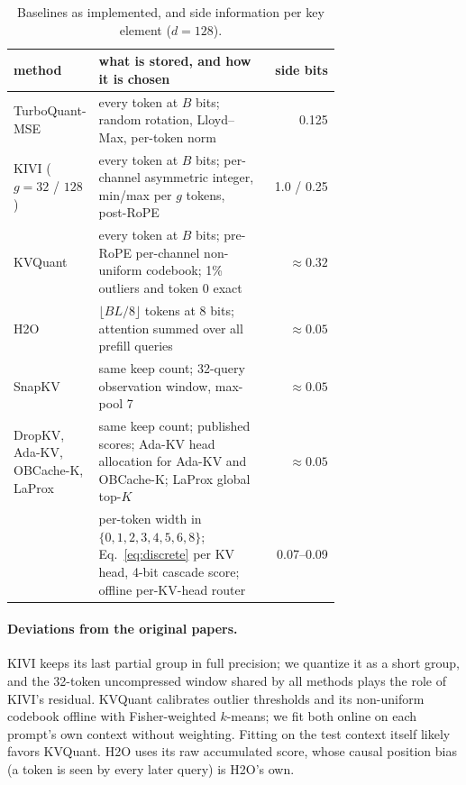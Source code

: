 \begin{table}[h]
\centering
\small
\setlength{\tabcolsep}{4pt}
\caption{Baselines as implemented, and side information per key element ($d=128$).}
\label{tab:app-side}
\begin{tabular}{@{}p{0.2\linewidth}p{0.52\linewidth}r@{}}
\toprule
method & what is stored, and how it is chosen & side bits \\
\midrule
TurboQuant-MSE & every token at $B$ bits; random rotation, Lloyd--Max, per-token norm & 0.125 \\
KIVI ($g=32$ / $128$) & every token at $B$ bits; per-channel asymmetric integer, min/max per $g$ tokens, post-RoPE & 1.0 / 0.25 \\
KVQuant & every token at $B$ bits; pre-RoPE per-channel non-uniform codebook; 1\% outliers and token 0 exact & $\approx0.32$ \\
H2O & $\lfloor BL/8\rfloor$ tokens at 8 bits; attention summed over all prefill queries & $\approx0.05$ \\
SnapKV & same keep count; 32-query observation window, max-pool 7 & $\approx0.05$ \\
DropKV, Ada-KV, OBCache-K, LaProx & same keep count; published scores; Ada-KV head allocation for Ada-KV and OBCache-K; LaProx global top-$K$ & $\approx0.05$ \\
\sieve{} & per-token width in $\{0,1,2,3,4,5,6,8\}$; Eq.~\ref{eq:discrete} per KV head, 4-bit cascade score; offline per-KV-head router & 0.07--0.09 \\
\bottomrule
\end{tabular}
\end{table}

\paragraph{Deviations from the original papers.}
KIVI keeps its last partial group in full precision; we quantize it as a short
group, and the 32-token uncompressed window shared by all methods plays the
role of KIVI's residual.  
KVQuant calibrates outlier thresholds and its
non-uniform codebook offline with Fisher-weighted $k$-means; we fit both online
on each prompt's own context without weighting.  Fitting on the test context
itself likely favors KVQuant.  H2O
uses its raw accumulated score, whose causal position bias (a token is seen by
every later query) is H2O's own.  

